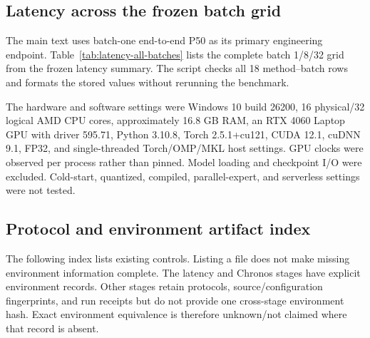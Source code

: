 \subsection{Latency across the frozen batch grid}
\label{sec:appendix-latency-grid}
\label{app:latency-all}

The main text uses batch-one end-to-end P50 as its primary engineering endpoint.  Table~\ref{tab:latency-all-batches} lists the complete batch 1/8/32 grid from the frozen latency summary.  The script  checks all 18 method--batch rows and formats the stored values without rerunning the benchmark.

The hardware and software settings were Windows 10 build 26200, 16 physical/32 logical AMD CPU cores, approximately 16.8 GB RAM, an RTX 4060 Laptop GPU with driver 595.71, Python 3.10.8, Torch 2.5.1+cu121, CUDA 12.1, cuDNN 9.1, FP32, and single-threaded Torch/OMP/MKL host settings.  GPU clocks were observed per process rather than pinned.  Model loading and checkpoint I/O were excluded.  Cold-start, quantized, compiled, parallel-expert, and serverless settings were not tested.



\FloatBarrier

\subsection{Protocol and environment artifact index}
\label{sec:appendix-artifact-index}

The following index lists existing controls.  Listing a file does not make missing environment information complete.  The latency and Chronos stages have explicit environment records.  Other stages retain protocols, source/configuration fingerprints, and run receipts but do not provide one cross-stage environment hash.  Exact environment equivalence is therefore unknown/not claimed where that record is absent.

